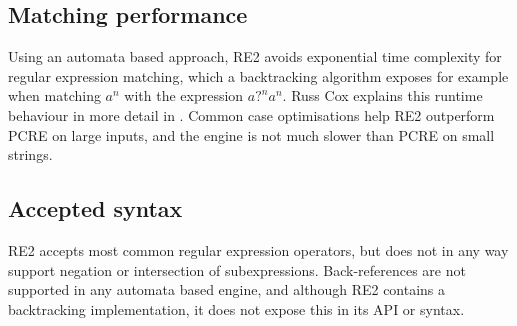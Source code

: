 \subsection{Matching performance}

Using an automata based approach, RE2 avoids exponential time complexity for
regular expression matching, which a backtracking algorithm exposes for example
when matching $a^n$ with the expression $a?^na^n$. Russ Cox explains this
runtime behaviour in more detail in \cite{regexp1}. Common case optimisations
help RE2 outperform PCRE on large inputs, and the engine is not much slower than
PCRE on small strings.


\subsection{Accepted syntax}

RE2 accepts most common regular expression operators, but does not in any way
support negation or intersection of subexpressions. Back-references are not
supported in any automata based engine, and although RE2 contains a backtracking
implementation, it does not expose this in its API or syntax.


